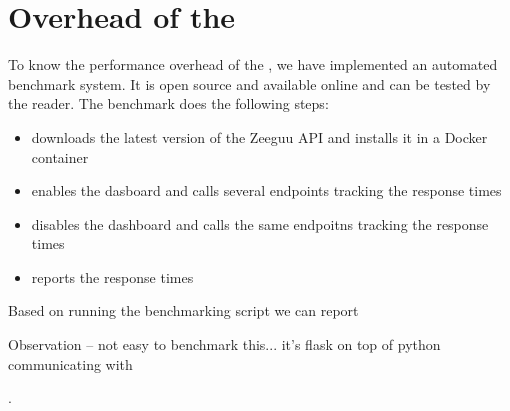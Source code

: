  

\section{Overhead of the \tool}
\label{sec:overhead}


To know the performance overhead of the \tool, we have implemented an automated benchmark system. It is open source and available online and can be tested by the reader. The benchmark does the following steps: 

\begin{itemize}
	\item downloads the latest version of the Zeeguu API and installs it in a Docker container
	\item enables the dasboard and calls several endpoints tracking the response times
	\item disables the dashboard and calls the same endpoitns tracking the response times
	\item reports the response times
\end{itemize}

Based on running the benchmarking script we can report 

Observation -- not easy to benchmark this... it's flask on top of python communicating with 


.


  